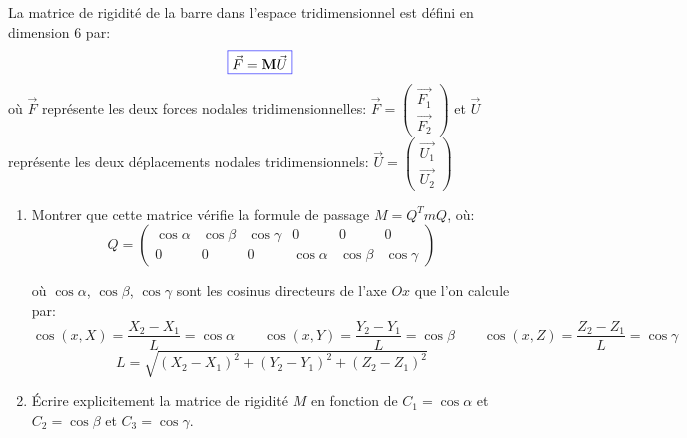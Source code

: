 \documentclass[a4paper]{article}
\newcommand{\myredbox}[1]{\fcolorbox{blue}{white}{$\displaystyle#1$}}
\begin{document}
 La matrice de rigidité de la barre dans l'espace tridimensionnel est défini en dimension 6 par:
  \[\myredbox{\vec{F}= \mbox{\textbf{M}} \vec{U} }\]
  où $\vec F$ représente les deux forces nodales tridimensionnelles: $\vec F=\left(\begin{array}{l} 
\vec{F_{1}}\\\vec{F_{2}}
\end{array}\right) $ et $\vec U$ représente les deux déplacements nodales tridimensionnels:  $\vec U=\left(\begin{array}{l} 
\vec{U_{1}}\\\vec{U_{2}}
\end{array}\right) $
\begin{enumerate}
\item Montrer que cette matrice vérifie la formule de passage $M=Q^TmQ$, où: 
\[Q = \left(\begin{array}{cccccc} 
\cos\alpha &\cos\beta&\cos\gamma&0&0&0\\
0&0&0&\cos\alpha &\cos\beta&\cos\gamma
\end{array}\right)   \]

où $\cos\alpha$, $\cos\beta$, $\cos\gamma$ sont les cosinus directeurs de l'axe $Ox$ que l'on calcule par:
 \[\cos(x,X) =\frac{X_2-X_1}{L}=\cos\alpha\qquad \cos(x,Y) =\frac{Y_2-Y_1}{L}=\cos\beta\qquad\cos(x,Z) =\frac{Z_2-Z_1}{L}=\cos\gamma\]
 \[L=\sqrt{(X_2-X_1)^2+(Y_2-Y_1)^2+(Z_2-Z_1)^2}\]

\item Écrire explicitement la matrice de rigidité $M$ en fonction de $C_1=\cos\alpha$ et $C_2=\cos\beta$ et $C_3=\cos\gamma$.

\end{enumerate}
 
\end{document}
